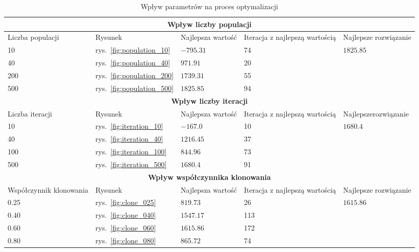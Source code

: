 \documentclass[a4paper]{article}
\begin{document}
\begin{table}[h]
    \centering
    \caption{Wpływ parametrów na proces optymalizacji}
    \begin{tabular}{m{30mm} m{10mm} l m{30mm} m{30mm}}
        \multicolumn{5}{c}{\textbf{Wpływ liczby populacji}} \\ \hline
        Liczba populacji & Rysunek & Najlepsza wartość & Iteracja z \newline najlepszą wartością & Najlepsze \newline rozwiązanie \\
        10  & rys.~\ref{fig:population_10} & $-795.31$ & 74 & \multirow{4}{*}{$1825.85$} \\
        40  & rys.~\ref{fig:population_40} & $ 971.91$ & 20 &  \\
        200 & rys.~\ref{fig:population_200}& $1739.31$ & 55 &  \\
        500 & rys.~\ref{fig:population_500}& $1825.85$ & 94 &  \\
        
        \multicolumn{5}{c}{\textbf{Wpływ liczby iteracji}} \\ \hline
        Liczba iteracji & Rysunek & Najlepsza wartość & Iteracja z \newline najlepszą wartością & Najlepsze\newline rozwiązanie \\
        10  & rys.~\ref{fig:iteration_10} & $-167.0$ & 10 & \multirow{4}{*}{$1680.4$} \\
        40  & rys.~\ref{fig:iteration_40} & $1216.45$ & 37 &  \\
        100 & rys.~\ref{fig:iteration_100}& $ 844.96$ & 73 &  \\
        500 & rys.~\ref{fig:iteration_500}& $1680.4$ & 91 &  \\
        
        \multicolumn{5}{c}{\textbf{Wpływ współczynnika klonowania}} \\ \hline
        Współczynnik \newline klonowania & Rysunek & Najlepsza wartość & Iteracja z \newline najlepszą wartością & Najlepsze \newline rozwiązanie \\
        0.25 & rys.~\ref{fig:clone_025} & $ 819.73$ & 26 & \multirow{4}{*}{$1615.86$} \\
        0.40 & rys.~\ref{fig:clone_040} & $1547.17$ & 113 &  \\
        0.60 & rys.~\ref{fig:clone_060} & $1615.86$ & 172 &  \\
        0.80 & rys.~\ref{fig:clone_080} & $ 865.72$ & 74 &  \\
        

\end{tabular}
\end{table}
\end{document}

